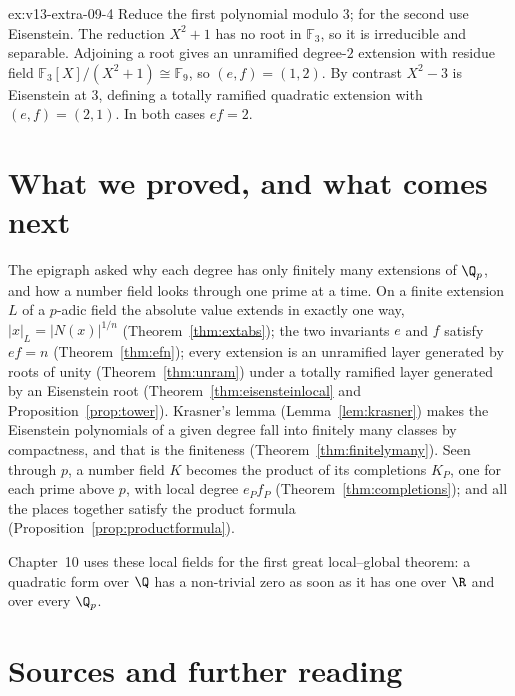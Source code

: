 \begin{solution}{ex:v13-extra-09-4}
\idea Reduce the first polynomial modulo $3$; for the second use Eisenstein.
\writeup The reduction $X^2+1$ has no root in $\mathbb F_3$, so it is irreducible and separable. Adjoining a root gives an unramified degree-$2$ extension with residue field $\mathbb F_3[X]/(X^2+1)\cong\mathbb F_9$, so $(e,f)=(1,2)$. By contrast $X^2-3$ is Eisenstein at $3$, defining a totally ramified quadratic extension with $(e,f)=(2,1)$. In both cases $ef=2$.
\end{solution}

\section{What we proved, and what comes next}

The epigraph asked why each degree has only finitely many extensions of $\Q_p$, and how a number field looks through one
prime at a time. On a finite extension $L$ of a $p$-adic field the absolute value extends in exactly one way,
$|x|_L=|N(x)|^{1/n}$ (Theorem~\ref{thm:extabs}); the two invariants $e$ and $f$ satisfy $ef=n$ (Theorem~\ref{thm:efn}); every
extension is an unramified layer generated by roots of unity (Theorem~\ref{thm:unram}) under a totally ramified layer generated
by an Eisenstein root (Theorem~\ref{thm:eisensteinlocal} and Proposition~\ref{prop:tower}). Krasner's lemma (Lemma~\ref{lem:krasner})
makes the Eisenstein polynomials of a given degree fall into finitely many classes by compactness, and that is the finiteness
(Theorem~\ref{thm:finitelymany}). Seen through $p$, a number field $K$ becomes the product of its completions $K_P$, one for each
prime above $p$, with local degree $e_Pf_P$ (Theorem~\ref{thm:completions}); and all the places together satisfy the product
formula (Proposition~\ref{prop:productformula}).

Chapter~10 uses these local fields for the first great local--global theorem: a quadratic form over $\Q$ has a non-trivial zero
as soon as it has one over $\R$ and over every $\Q_p$.

\section*{Sources and further reading}

